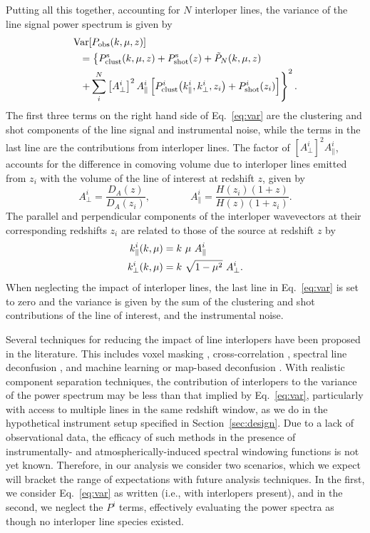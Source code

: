 \documentclass[twocolumn]{aastex631}
\newcommand{\be}{\begin{equation}}
\newcommand{\ee}{\end{equation}}
\begin{document}
Putting all this together, accounting for $N$ interloper lines, the variance of the line signal power spectrum is given by 
\begin{align}\label{eq:var}
{\rm Var}&[P_{\rm obs}(k,\mu,z)] \notag \\
&\hspace{-.13in} =  \left\{P_{\rm clust}^{\rm s}(k,\mu,z) + P_{\rm shot}^{\rm s}(z) + \tilde P_N(k,\mu,z)\right. \notag \\
& \hspace{-.13in} \left. + \sum_i^N \left[A_\perp^i\right]^2 A_\parallel^i \left[P_{\rm clust}^i\big(k_\parallel^i, k_\perp^i, z_i \big) + P_{\rm shot}^i(z_i)\right]\right\}^2. 
\end{align}
The first three terms on the right hand side of Eq.~\eqref{eq:var} are the clustering and shot components of the line signal and instrumental noise, while the terms in the last line are the contributions from interloper lines. The factor of $\left[A_\perp^i\right]^2 A_\parallel^i$, accounts for the difference in comoving volume due to interloper lines emitted from $z_i$ with the volume of the line of interest at redshift $z$, given by
\be
A_\perp^i = \frac{D_A(z)}{D_A(z_i)},  \qquad \qquad A_\parallel^i = \frac{H(z_i)(1+z)}{H(z)(1+z_i)}.
\ee
The parallel and perpendicular components of the interloper wavevectors at their corresponding redshifts $z_i$ are related to those of the source at redshift $z$ by
\begin{align}
k_\parallel^i(k,\mu) &= k \ \mu \ A_\parallel^i \notag \\
k_\perp^i(k,\mu) &= k \ \sqrt{1-\mu^2} \  A_\perp^i .
\end{align}
When neglecting the impact of interloper lines, the last line in Eq.~\eqref{eq:var} is set to zero and the variance is given by the sum of the clustering and shot contributions of the line of interest, and the instrumental noise. 

Several techniques for reducing the impact of line interlopers have been proposed in the literature. This includes voxel masking \citep{Silva:2014ira,Breysse:2015baa,Sun_2018}, cross-correlation \citep{Lidz:2016lub}, spectral line deconfusion \citep{Lidz:2016lub,Cheng:2016,Gong:2020lim}, and machine learning \citep{Moriwaki_2020} or map-based deconfusion \citep{Kogut2015,Cheng:2020asz}. With realistic component separation techniques, the contribution of interlopers to the variance of the power spectrum may be less than that implied by Eq.~\eqref{eq:var}, particularly with access to multiple lines in the same redshift window, as we do in the hypothetical instrument setup specified in Section~\ref{sec:design}. Due to a lack of observational data, the efficacy of such methods in the presence of instrumentally- and atmospherically-induced spectral windowing functions is not yet known. Therefore, in our analysis we consider two scenarios, which we expect will bracket the range of expectations with future analysis techniques. In the first, we consider Eq.~\eqref{eq:var} as written (i.e., with interlopers present), and in the second, we neglect the $P^{i}$ terms, effectively evaluating the power spectra as though no interloper line species existed.
\end{document}
